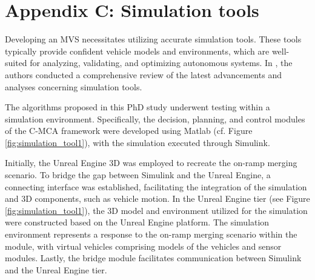 \appendix 
\thispagestyle{empty}
\hypertarget{AppendixB}{}\section*{Appendix C: Simulation tools} 



Developing an MVS necessitates utilizing accurate simulation tools. These tools typically provide confident vehicle models and environments, which are well-suited for analyzing, validating, and optimizing autonomous systems. In \cite{tong2020overview}, the authors conducted a comprehensive review of the latest advancements and analyses concerning simulation tools.



The algorithms proposed in this PhD study underwent testing within a simulation environment. Specifically, the decision, planning, and control modules of the C-MCA framework were developed using Matlab (cf. Figure \ref{fig:simulation_tool1}), with the simulation executed through Simulink.

Initially, the Unreal Engine 3D was employed to recreate the on-ramp merging scenario. To bridge the gap between Simulink and the Unreal Engine, a connecting interface was established, facilitating the integration of the simulation and 3D components, such as vehicle motion. In the Unreal Engine tier (see Figure \ref{fig:simulation_tool1}), the 3D model and environment utilized for the simulation were constructed based on the Unreal Engine platform. The simulation environment represents a response to the on-ramp merging scenario within the module, with virtual vehicles comprising models of the vehicles and sensor modules. Lastly, the bridge module facilitates communication between Simulink and the Unreal Engine tier.




